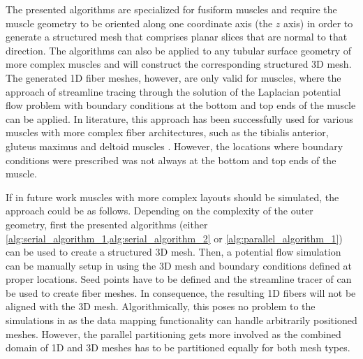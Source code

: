 The presented algorithms are specialized for fusiform muscles and require the muscle geometry to be oriented along one coordinate axis (the $z$ axis) in order to generate a structured mesh  that comprises planar slices that are normal to that direction.
The algorithms can also be applied to any tubular surface geometry of more complex muscles and will construct the corresponding structured 3D mesh. The generated 1D fiber meshes, however, are only valid for muscles, where the approach of streamline tracing through the solution of the Laplacian potential flow problem with boundary conditions at the bottom and top ends of the muscle can be applied.
In literature, this approach has been successfully used for various muscles with more complex fiber architectures, such as the tibialis anterior, gluteus maximus and deltoid muscles \cite{Choi2013}. However, the locations where boundary conditions were prescribed was not always at the bottom and top ends of the muscle.

If in future work muscles with more complex layouts should be simulated, the approach could be as follows. Depending on the complexity of the outer geometry, first the presented algorithms (either \cref{alg:serial_algorithm_1,alg:serial_algorithm_2} or \cref{alg:parallel_algorithm_1}) can be used to create a structured 3D mesh. Then, a potential flow simulation can be manually setup in \opendihu{} using the 3D mesh and boundary conditions defined at proper locations. Seed points have to be defined and the streamline tracer of \opendihu{} can be used to create fiber meshes. In consequence, the resulting 1D fibers will not be aligned with the 3D mesh. Algorithmically, this poses no problem to the simulations in \opendihu{} as the data mapping functionality can handle arbitrarily positioned meshes. However, the parallel partitioning gets more involved as the combined domain of 1D and 3D meshes has to be partitioned equally for both mesh types.

